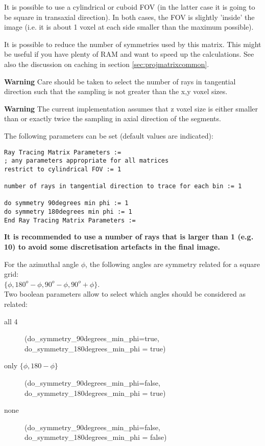 \documentclass{article}
\begin{document}
It is possible to use a cylindrical or cuboid FOV (in the latter 
case it is going to be square in transaxial direction). In both 
cases, the FOV is slightly 'inside' the image (i.e. it is about 
1 voxel at each side smaller than the maximum possible).

It is possible to reduce the number of symmetries used by this 
matrix. This might be useful if you have plenty of RAM and want 
to speed up the calculations. See also the discussion on caching 
in section \ref{sec:projmatrixcommon}.

\textbf{Warning} Care should be taken to select the number of rays 
in tangential direction such that the sampling is not greater 
than the x,y voxel sizes.

\textbf{Warning} The current implementation assumes that z voxel size 
is either smaller than or exactly twice the sampling in axial 
direction of the segments.

{ 
}

The following parameters can be set (default values are indicated):

\begin{verbatim}
Ray Tracing Matrix Parameters := 
; any parameters appropriate for all matrices
restrict to cylindrical FOV := 1

number of rays in tangential direction to trace for each bin := 1

do symmetry 90degrees min phi := 1 
do symmetry 180degrees min phi := 1
End Ray Tracing Matrix Parameters :=
\end{verbatim}

\textbf{It is recommended to use a number of rays that is larger than 1 (e.g. 10) to
avoid some discretisation artefacts in the final image.}

For the azimuthal angle $\phi$, the following angles are symmetry 
related for a square grid: \\
$\{\phi, 180^{o}-\phi, 90^{o}-\phi, 90^{o}+\phi\}$.\\
Two boolean parameters allow to select which angles should be 
considered as related:
\begin{description}
\item[all 4]
  (do\_symmetry\_90degrees\_min\_phi=true,  \\
do\_symmetry\_180degrees\_min\_phi = true)
\item[only $\{ \phi, 180- \phi \}$]
(do\_symmetry\_90degrees\_min\_phi=false,  \\
do\_symmetry\_180degrees\_min\_phi = true)
\item[none]
(do\_symmetry\_90degrees\_min\_phi=false, \\
do\_symmetry\_180degrees\_min\_phi = false)
\end{description}
\end{document}
